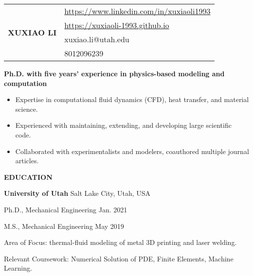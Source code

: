 \documentclass[11pt, letterpaper]{article}
\begin{document}
\begin{tabular}{@{} p{} p{} @{}}
   \multirow{4}{*}{{\textbf{\huge XUXIAO LI}}} & 
    \href{https://www.linkedin.com/in/xuxiaoli1993}{https://www.linkedin.com/in/xuxiaoli1993} \\
     & \href{https://xuxiaoli-1993.github.io}{https://xuxiaoli-1993.github.io} \\
     & xuxiao.li@utah.edu \\
     & 8012096239
\end{tabular}

% 
% 
% 

\vspace{24pt}

\textbf{Ph.D. with five years' experience in physics-based modeling and computation}
\begin{itemize}[leftmargin=*, labelsep=5mm]
   \item Expertise in computational fluid dynamics (CFD), heat transfer, and material science.
   \item Experienced with maintaining, extending, and developing large scientific code.
   \item Collaborated with experimentalists and modelers, coauthored multiple journal articles.
\end{itemize}

\vspace{12pt}

\textbf{EDUCATION}

\fullrule

\textbf{University of Utah} \hfill Salt Lake City, Utah, USA

Ph.D., Mechanical Engineering  \hfill Jan. 2021

M.S., Mechanical Engineering  \hfill May 2019

Area of Focus: thermal-fluid modeling of metal 3D printing and laser welding.

Relevant Coursework: Numerical Solution of PDE, Finite Elements, Machine Learning.

\vskip 6pt
\end{document}
